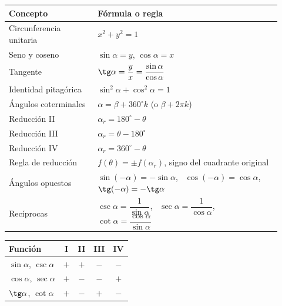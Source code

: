 \documentclass[12pt, letterpaper]{article}
\providecommand{\sen}{\sin}
\begin{document}
\begin{cuadroteoria}
  \small
  \begin{center}
  \begin{tabular}{@{}p{0.30\linewidth}p{0.62\linewidth}@{}}
    \toprule
    \textbf{Concepto} & \textbf{Fórmula o regla} \\
    \midrule
    Circunferencia unitaria & $x^2+y^2=1$ \\[2pt]
    Seno y coseno & $\sen\alpha=y$, \quad $\cos\alpha=x$ \\[2pt]
    Tangente & $\tg\alpha=\dfrac{y}{x}=\dfrac{\sen\alpha}{\cos\alpha}$ \\[6pt]
    Identidad pitagórica & $\sen^2\alpha+\cos^2\alpha=1$ \\[2pt]
    Ángulos coterminales & $\alpha=\beta+360^\circ k$ \quad (o $\beta+2\pi k$) \\[2pt]
    Reducción II & $\alpha_r=180^\circ-\theta$ \\[2pt]
    Reducción III & $\alpha_r=\theta-180^\circ$ \\[2pt]
    Reducción IV & $\alpha_r=360^\circ-\theta$ \\[2pt]
    Regla de reducción & $f(\theta)=\pm f(\alpha_r)$, signo del cuadrante original \\[2pt]
    Ángulos opuestos & $\sen(-\alpha)=-\sen\alpha$, \ $\cos(-\alpha)=\cos\alpha$, \ $\tg(-\alpha)=-\tg\alpha$ \\[2pt]
    Recíprocas & $\csc\alpha=\dfrac{1}{\sen\alpha}$, \ $\sec\alpha=\dfrac{1}{\cos\alpha}$, \ $\cot\alpha=\dfrac{\cos\alpha}{\sen\alpha}$ \\
    \bottomrule
  \end{tabular}
  \end{center}
\end{cuadroteoria}

\begin{center}
\small
\begin{tabular}{@{}lcccc@{}}
  \toprule
  \textbf{Función} & \textbf{I} & \textbf{II} & \textbf{III} & \textbf{IV} \\
  \midrule
  $\sen\alpha$, $\csc\alpha$ & $+$ & $+$ & $-$ & $-$ \\
  $\cos\alpha$, $\sec\alpha$ & $+$ & $-$ & $-$ & $+$ \\
  $\tg\alpha$, $\cot\alpha$  & $+$ & $-$ & $+$ & $-$ \\
  \bottomrule
\end{tabular}
\end{center}
\end{document}
